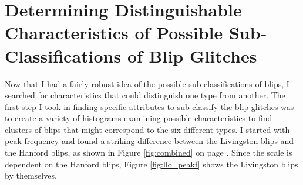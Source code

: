 \documentclass[a4paper]{article}
\begin{document}
\section{Determining Distinguishable Characteristics of Possible Sub-Classifications of Blip Glitches} \label{plots}

Now that I had a fairly robust idea of the possible sub-classifications of blips, I searched for characteristics that could distinguish one type from another. The first step I took in finding specific attributes to sub-classify the blip glitches was to create a variety of histograms examining possible characteristics to find clusters of blips that might correspond to the six different types. I started with peak frequency and found a striking difference between the Livingston blips and the Hanford blips, as shown in Figure \ref{fig:combined} on page \pageref{fig:combined_peakf}. Since the scale is dependent on the Hanford blips, Figure \ref{fig:llo_peakf} shows the Livingston blips by themselves.
\end{document}
